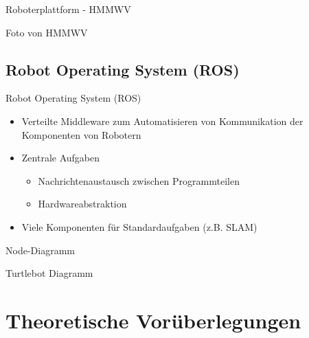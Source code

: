 \documentclass[18pt]{beamer}
\begin{document}
\begin{frame}{Roboterplattform - HMMWV}
\begin{center}
	Foto von HMMWV
\end{center}
\end{frame}


\subsection{Robot Operating System (ROS)}
\begin{frame}{Robot Operating System (ROS)}
\begin{itemize}
	\item Verteilte Middleware zum Automatisieren von Kommunikation der Komponenten von Robotern
	\item Zentrale Aufgaben
	\begin{itemize}
		\item Nachrichtenaustausch zwischen Programmteilen
		\item Hardwareabstraktion
	\end{itemize}
	\item Viele Komponenten für Standardaufgaben (z.B. SLAM)
\end{itemize}
\end{frame}

\begin{frame}{Node-Diagramm}
\begin{center}
	Turtlebot Diagramm
\end{center}
\end{frame}



\section{Theoretische Vorüberlegungen}
\end{document}
